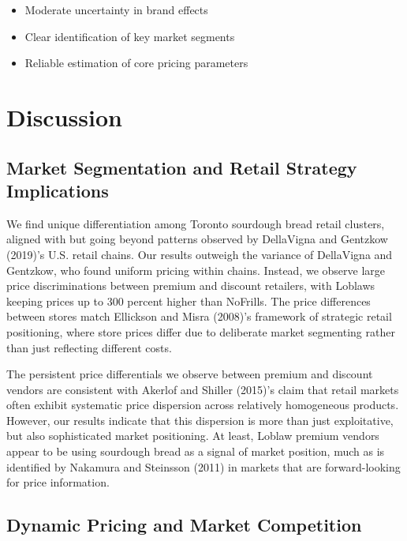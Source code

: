\documentclass[
  letterpaper,
  DIV=11,
  numbers=noendperiod]{scrartcl}
\providecommand{\tightlist}{%
  \setlength{\itemsep}{0pt}\setlength{\parskip}{0pt}}\usepackage{longtable,booktabs,array}
\begin{document}
\begin{itemize}
\tightlist
\item
  Moderate uncertainty in brand effects
\item
  Clear identification of key market segments
\item
  Reliable estimation of core pricing parameters
\end{itemize}

\section{Discussion}\label{sec-discussion}

\subsection{Market Segmentation and Retail Strategy
Implications}\label{market-segmentation-and-retail-strategy-implications}

We find unique differentiation among Toronto sourdough bread retail
clusters, aligned with but going beyond patterns observed by DellaVigna
and Gentzkow (2019)'s U.S. retail chains. Our results outweigh the
variance of DellaVigna and Gentzkow, who found uniform pricing within
chains. Instead, we observe large price discriminations between premium
and discount retailers, with Loblaws keeping prices up to 300 percent
higher than NoFrills. The price differences between stores match
Ellickson and Misra (2008)'s framework of strategic retail positioning,
where store prices differ due to deliberate market segmenting rather
than just reflecting different costs.

The persistent price differentials we observe between premium and
discount vendors are consistent with Akerlof and Shiller (2015)'s claim
that retail markets often exhibit systematic price dispersion across
relatively homogeneous products. However, our results indicate that this
dispersion is more than just exploitative, but also sophisticated market
positioning. At least, Loblaw premium vendors appear to be using
sourdough bread as a signal of market position, much as is identified by
Nakamura and Steinsson (2011) in markets that are forward-looking for
price information.

\subsection{Dynamic Pricing and Market
Competition}\label{dynamic-pricing-and-market-competition}
\end{document}
